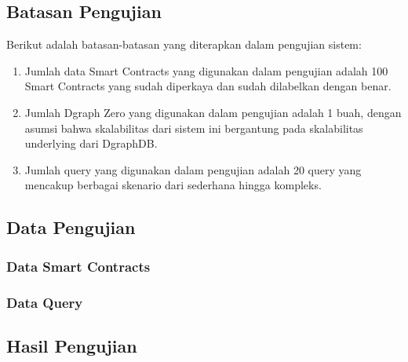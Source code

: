 \subsection{Batasan Pengujian}

Berikut adalah batasan-batasan yang diterapkan dalam pengujian sistem:
\begin{enumerate}
    \item Jumlah data Smart Contracts yang digunakan dalam pengujian adalah 100 Smart Contracts yang sudah diperkaya dan sudah dilabelkan dengan benar.
    \item Jumlah Dgraph Zero yang digunakan dalam pengujian adalah 1 buah, dengan asumsi bahwa skalabilitas dari sistem ini bergantung pada skalabilitas underlying dari DgraphDB.
    \item Jumlah query yang digunakan dalam pengujian adalah 20 query yang mencakup berbagai skenario dari sederhana hingga kompleks.
\end{enumerate}


\subsection{Data Pengujian}

\subsubsection{Data Smart Contracts}

\subsubsection{Data Query}

\subsection{Hasil Pengujian}